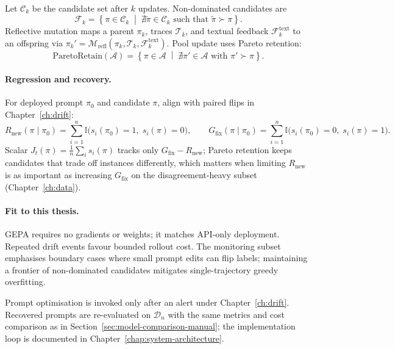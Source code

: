 Let $\mathcal{C}_k$ be the candidate set after $k$ updates. Non-dominated candidates are
\begin{equation}
    \mathcal{F}_k
    =
    \left\{
        \pi \in \mathcal{C}_k
        \;\middle|\;
        \nexists \tilde{\pi} \in \mathcal{C}_k \text{ such that } \tilde{\pi} \succ \pi
    \right\}.
\end{equation}
Reflective mutation maps a parent $\pi_k$, traces $\mathcal{T}_k$, and textual feedback $\mathcal{F}_k^{\mathrm{text}}$ to an offspring via $\pi_k' = \mathcal{M}_{\mathrm{refl}}(\pi_k,\mathcal{T}_k,\mathcal{F}_k^{\mathrm{text}})$. Pool update uses Pareto retention:
\begin{equation}
    \mathrm{ParetoRetain}(\mathcal{A})
    =
    \left\{
        \pi \in \mathcal{A}
        \;\middle|\;
        \nexists \pi' \in \mathcal{A} \text{ with } \pi' \succ \pi
    \right\}.
\end{equation}

\paragraph{Regression and recovery.}
For deployed prompt $\pi_0$ and candidate $\pi$, align with paired flips in Chapter~\ref{ch:drift}:
\begin{equation}
    R_{\mathrm{new}}(\pi \mid \pi_0)
    =
    \sum_{i=1}^n
    \mathbb{I}\bigl(s_i(\pi_0)=1,\; s_i(\pi)=0\bigr),
    \qquad
    G_{\mathrm{fix}}(\pi \mid \pi_0)
    =
    \sum_{i=1}^n
    \mathbb{I}\bigl(s_i(\pi_0)=0,\; s_i(\pi)=1\bigr).
\end{equation}
Scalar $J_t(\pi)=\frac{1}{n}\sum_i s_i(\pi)$ tracks only $G_{\mathrm{fix}}-R_{\mathrm{new}}$; Pareto retention keeps candidates that trade off instances differently, which matters when limiting $R_{\mathrm{new}}$ is as important as increasing $G_{\mathrm{fix}}$ on the disagreement-heavy subset (Chapter~\ref{ch:data}).

\paragraph{Fit to this thesis.}
GEPA requires no gradients or weights; it matches API-only deployment. Repeated drift events favour bounded rollout cost. The monitoring subset emphasises boundary cases where small prompt edits can flip labels; maintaining a frontier of non-dominated candidates mitigates single-trajectory greedy overfitting.

Prompt optimisation is invoked only after an alert under Chapter~\ref{ch:drift}. Recovered prompts are re-evaluated on $\mathcal{D}_n$ with the same metrics and cost comparison as in Section~\ref{sec:model-comparison-manual}; the implementation loop is documented in Chapter~\ref{chap:system-architecture}.
